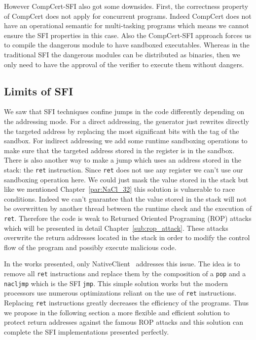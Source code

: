 \documentclass[11pt]{sdm}
\begin{document}
However CompCert-SFI also got some downsides. First, the correctness property of CompCert does not apply for concurrent programs. Indeed CompCert does not have an operational semantic for multi-tasking programs which means we cannot ensure the SFI properties in this case. Also the CompCert-SFI approach forces us to compile the dangerous module to have sandboxed executables.
Whereas in the traditional SFI the dangerous modules can be distributed as binaries, then we only need to have the approval of the verifier to execute them without dangers. \\


\subsection{Limits of SFI}
\label{sub:Limits of SFI}

We saw that SFI techniques confine jumps in the code differently depending on the addressing mode. For a direct addressing, the generator just rewrites directly the targeted address by replacing the most significant bits with the tag of the sandbox. For indirect addressing we add some runtime sandboxing operations to make sure that the targeted address stored in the register is in the sandbox. There is also another way to make a jump which uses an address stored in the stack: the \texttt{ret} instruction. Since \texttt{ret} does not use any register we can't use our sandboxing operation here. We could just mask the value stored in the stack but like we mentioned Chapter~\ref{par:NaCl_32} this solution is vulnerable to race conditions. Indeed we can't guarantee that the value stored in the stack will not be overwritten by another thread between the runtime check and the execution of \texttt{ret}. Therefore the code is weak to Returned Oriented Programing (ROP) attacks which will be presented in detail Chapter~\ref{sub:rop_attack}. These attacks overwrite the return addresses located in the stack in order to modify the control flow of the program and possibly execute malicious code. 

In the works presented, only NativeClient~\cite{Yee:2010:NCS:1629175.1629203} addresses this issue. The idea is to remove all \texttt{ret} instructions and replace them by the composition of a \texttt{pop} and a \texttt{nacljmp} which is the SFI \texttt{jmp}. 
This simple solution works but the modern processors use numerous optimizations reliant on the use of \texttt{ret} instructions. Replacing \texttt{ret} instructions greatly decreases the efficiency of the programs. 
Thus we propose in the following section a more flexible and efficient solution to protect return addresses against the famous ROP attacks and this solution can complete the SFI implementations presented perfectly. 
\end{document}
